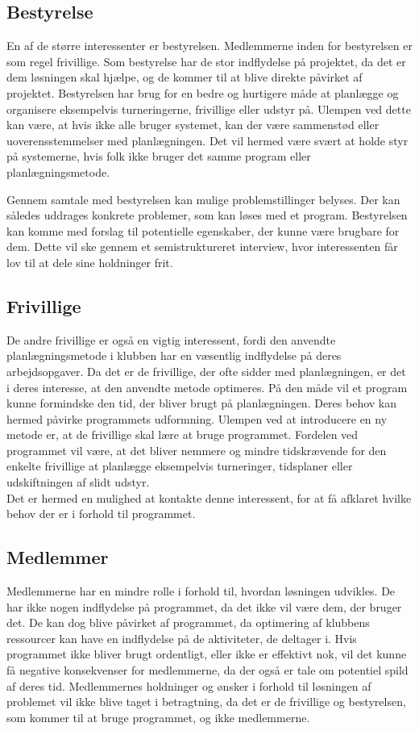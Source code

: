 \subsection*{Bestyrelse}
En af de større interessenter er bestyrelsen. Medlemmerne inden for bestyrelsen er som regel frivillige. Som bestyrelse har de stor indflydelse på projektet, da det er dem løsningen skal hjælpe, og de kommer til at blive direkte påvirket af projektet. Bestyrelsen har brug for en bedre og hurtigere måde at planlægge og organisere eksempelvis turneringerne, frivillige eller udstyr på. Ulempen ved dette kan være, at hvis ikke alle bruger systemet, kan der være sammenstød eller uoverensstemmelser med planlægningen. Det vil hermed være svært at holde styr på systemerne, hvis folk ikke bruger det samme program eller planlægningsmetode.
\par 
Gennem samtale med bestyrelsen kan mulige problemstillinger belyses. Der kan således uddrages konkrete problemer, som kan løses med et program. Bestyrelsen kan komme med forslag til potentielle egenskaber, der kunne være brugbare for dem. Dette vil ske gennem et semistruktureret interview, hvor interessenten får lov til at dele sine holdninger frit.

\subsection*{Frivillige}
De andre frivillige er også en vigtig interessent, fordi den anvendte planlægningsmetode i klubben har en væsentlig indflydelse på deres arbejdsopgaver. Da det er de frivillige, der ofte sidder med planlægningen, er det i deres interesse, at den anvendte metode optimeres. På den måde vil et program kunne formindske den tid, der bliver brugt på planlægningen. Deres behov kan hermed påvirke programmets udformning. Ulempen ved at introducere en ny metode er, at de frivillige skal lære at bruge programmet. Fordelen ved programmet vil være, at det bliver nemmere og mindre tidskrævende for den enkelte frivillige at planlægge eksempelvis turneringer, tidsplaner eller udskiftningen af slidt udstyr.\\
Det er hermed en mulighed at kontakte denne interessent, for at få afklaret hvilke behov der er i forhold til programmet.

\subsection*{Medlemmer}
Medlemmerne har en mindre rolle i forhold til, hvordan løsningen udvikles. De har ikke nogen indflydelse på programmet, da det ikke vil være dem, der bruger det. De kan dog blive påvirket af programmet, da optimering af klubbens ressourcer kan have en indflydelse på de aktiviteter, de deltager i. Hvis programmet ikke bliver brugt ordentligt, eller ikke er effektivt nok, vil det kunne få negative konsekvenser for medlemmerne, da der også er tale om potentiel spild af deres tid. Medlemmernes holdninger og ønsker i forhold til løsningen af problemet vil ikke blive taget i betragtning, da det er de frivillige og bestyrelsen, som kommer til at bruge programmet, og ikke medlemmerne.

